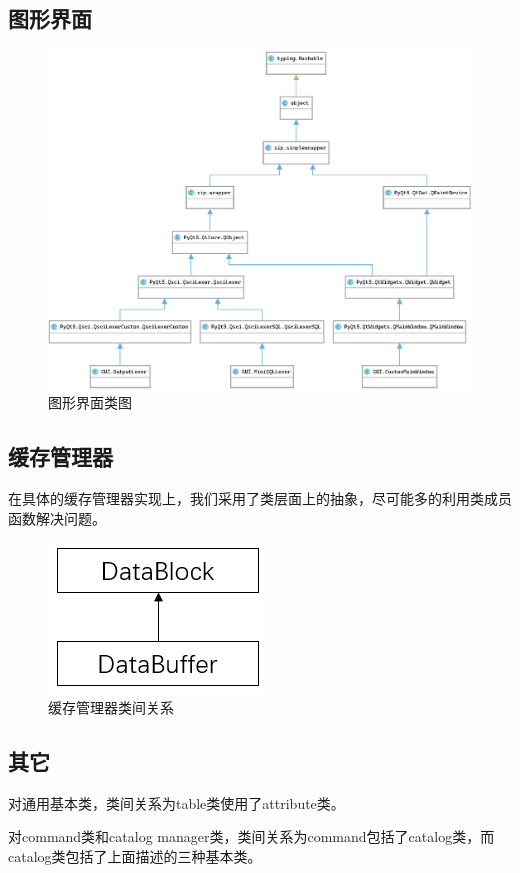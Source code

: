 \documentclass[UTF8]{ctexrep} %
\begin{document}
\subsection{图形界面}
\begin{figure}[H]
    \centering
    \includegraphics[width=\linewidth]{figure/gui_class.eps}
    \caption{图形界面类图}
    \label{fig:gui_class}
\end{figure}

\subsection{缓存管理器}
在具体的缓存管理器实现上，我们采用了类层面上的抽象，尽可能多的利用类成员函数解决问题。
\begin{figure}[H]
    \centering
    \includegraphics[width=0.25\linewidth]{figure/class1.jpg}
    \caption{缓存管理器类间关系}
    \label{fig:class1}
\end{figure}

\subsection{其它}
对通用基本类，类间关系为table类使用了attribute类。

对command类和catalog manager类，类间关系为command包括了catalog类，而catalog类包括了上面描述的三种基本类。
\end{document}
